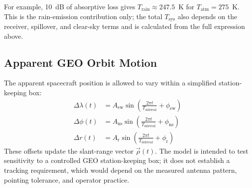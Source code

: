 For example, 10~dB of absorptive loss gives $T_{\mathrm{rain}}\approx247.5$~K for $T_{\mathrm{atm}}=275$~K. This is the rain-emission contribution only; the total $T_{\mathrm{sys}}$ also depends on the receiver, spillover, and clear-sky terms and is calculated from the full expression above.

\subsection{Apparent GEO Orbit Motion}
The apparent spacecraft position is allowed to vary within a simplified station-keeping box:
\begin{align}
    \Delta \lambda(t) &= A_{\mathrm{ew}} \sin\left(\frac{2\pi t}{T_{\mathrm{sidereal}}} + \phi_{\mathrm{ew}}\right) \\
    \Delta \phi(t) &= A_{\mathrm{ns}} \sin\left(\frac{2\pi t}{T_{\mathrm{sidereal}}} + \phi_{\mathrm{ns}}\right) \\
    \Delta r(t) &= A_{\mathrm{r}} \sin\left(\frac{2\pi t}{T_{\mathrm{sidereal}}} + \phi_{\mathrm{r}}\right)
\end{align}
These offsets update the slant-range vector $\vec{\rho}(t)$. The model is intended to test sensitivity to a controlled GEO station-keeping box; it does not establish a tracking requirement, which would depend on the measured antenna pattern, pointing tolerance, and operator practice.
